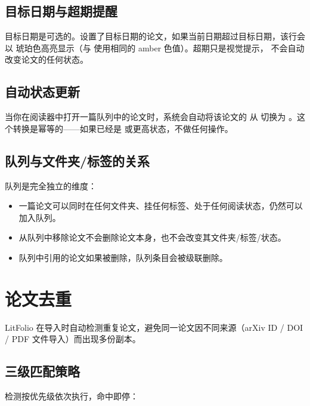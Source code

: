 \subsection{目标日期与超期提醒}

目标日期是可选的。设置了目标日期的论文，如果当前日期超过目标日期，该行会以
琥珀色高亮显示（与  使用相同的 amber 色值）。超期只是视觉提示，
不会自动改变论文的任何状态。

\subsection{自动状态更新}

当你在阅读器中打开一篇队列中的论文时，系统会自动将该论文的 
从  切换为 。这个转换是幂等的——如果已经是
 或更高状态，不做任何操作。

\subsection{队列与文件夹/标签的关系}

队列是完全独立的维度：

\begin{itemize}
  \item 一篇论文可以同时在任何文件夹、挂任何标签、处于任何阅读状态，仍然可以
    加入队列。
  \item 从队列中移除论文不会删除论文本身，也不会改变其文件夹/标签/状态。
  \item 队列中引用的论文如果被删除，队列条目会被级联删除。
\end{itemize}

\section{论文去重}

LitFolio 在导入时自动检测重复论文，避免同一论文因不同来源（arXiv ID / DOI / PDF
文件导入）而出现多份副本。

\subsection{三级匹配策略}

检测按优先级依次执行，命中即停：

